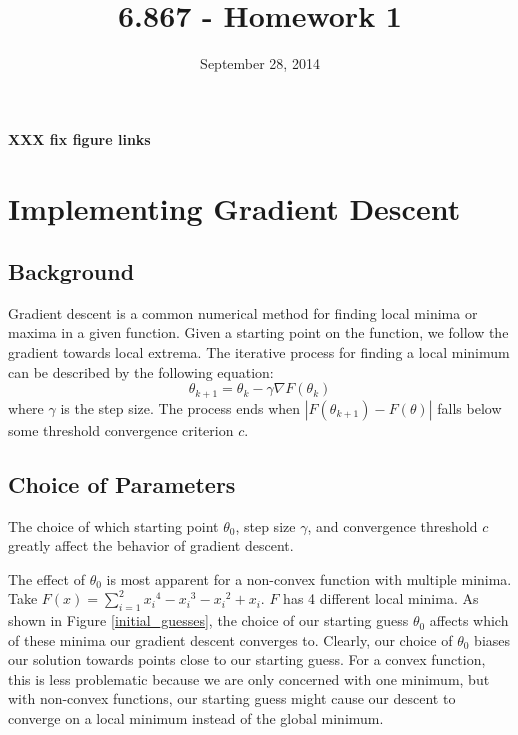 \documentclass[10pt]{article}   %
\theoremstyle{plain}
\begin{document}
\pagestyle{myheadings}          %
\title{6.867 - Homework 1}           %
\date{September 28, 2014}         %
\maketitle
\textbf{XXX fix figure links}

\section{Implementing Gradient Descent}

\subsection{Background}
Gradient descent is a common numerical method for finding local minima or maxima in a given function. Given a starting point on the function, we follow the gradient towards local extrema. The iterative process for finding a local minimum can be described by the following equation: \[\theta_{k+1} = \theta_k - \gamma \nabla F(\theta_k)\] where $\gamma$ is the step size. The process ends when $|F(\theta_{k+1}) - F(\theta)|$ falls below some threshold convergence criterion $c$. 

\subsection{Choice of Parameters}

The choice of which starting point $\theta_0$, step size $\gamma$, and convergence threshold $c$ greatly affect the behavior of gradient descent. 

The effect of $\theta_0$ is most apparent for a non-convex function with multiple minima. Take $F(x) = \sum\limits_{i=1}^{2} {x_i}^4 - {x_i}^3 - {x_i}^2 + x_i$. $F$ has 4 different local minima. As shown in Figure \ref{initial_guesses}, the choice of our starting guess $\theta_0$ affects which of these minima our gradient descent converges to. Clearly, our choice of $\theta_0$ biases our solution towards points close to our starting guess. For a convex function, this is less problematic because we are only concerned with one minimum, but with non-convex functions, our starting guess might cause our descent to converge on a local minimum instead of the global minimum.
\end{document}
